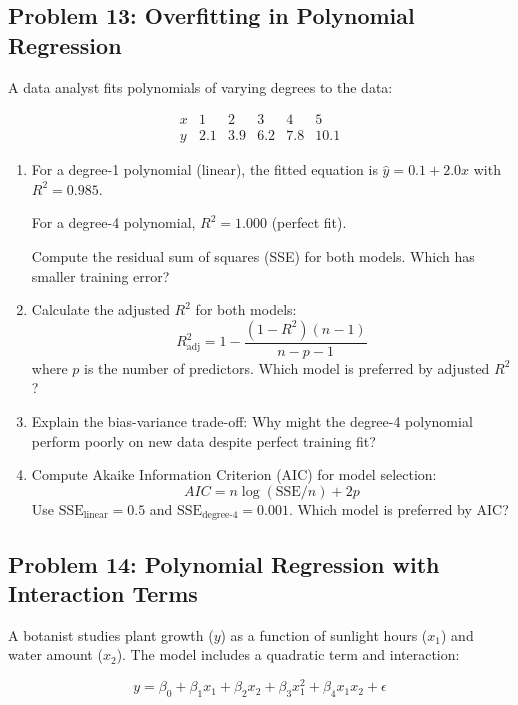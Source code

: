 \documentclass[12pt]{article}
\begin{document}
\subsection*{Problem 13: Overfitting in Polynomial Regression}

A data analyst fits polynomials of varying degrees to the data:

\[
\begin{array}{c|ccccc}
x & 1 & 2 & 3 & 4 & 5 \\
\hline
y & 2.1 & 3.9 & 6.2 & 7.8 & 10.1
\end{array}
\]

\begin{enumerate}[label=(\alph*)]
\item For a degree-1 polynomial (linear), the fitted equation is \(\hat{y} = 0.1 + 2.0x\) with \(R^2 = 0.985\).

For a degree-4 polynomial, \(R^2 = 1.000\) (perfect fit).

Compute the residual sum of squares (SSE) for both models. Which has smaller training error?

\item Calculate the adjusted \(R^2\) for both models:
\[
R^2_{\text{adj}} = 1 - \frac{(1-R^2)(n-1)}{n-p-1}
\]
where \(p\) is the number of predictors. Which model is preferred by adjusted \(R^2\)?

\item Explain the bias-variance trade-off: Why might the degree-4 polynomial perform poorly on new data despite perfect training fit?

\item Compute Akaike Information Criterion (AIC) for model selection:
\[
AIC = n \log(\text{SSE}/n) + 2p
\]
Use \(\text{SSE}_{\text{linear}} = 0.5\) and \(\text{SSE}_{\text{degree-4}} = 0.001\). Which model is preferred by AIC?
\end{enumerate}

\subsection*{Problem 14: Polynomial Regression with Interaction Terms}

A botanist studies plant growth (\(y\)) as a function of sunlight hours (\(x_1\)) and water amount (\(x_2\)). The model includes a quadratic term and interaction:

\[
y = \beta_0 + \beta_1 x_1 + \beta_2 x_2 + \beta_3 x_1^2 + \beta_4 x_1 x_2 + \epsilon
\]
\end{document}
